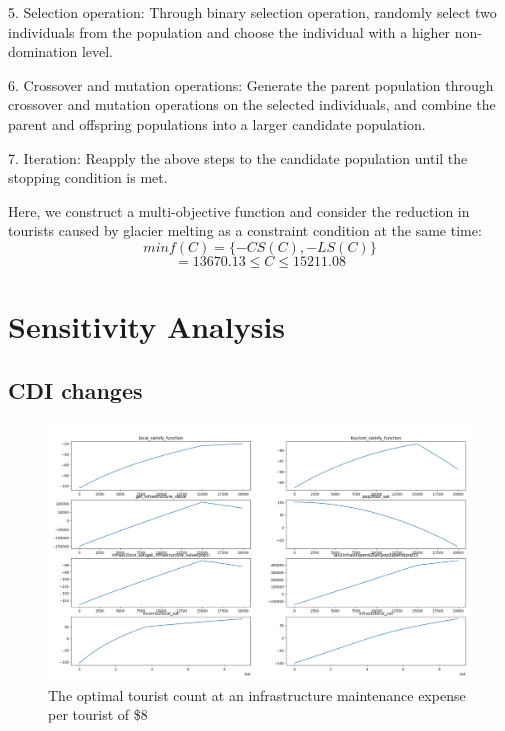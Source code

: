 \documentclass[12pt]{article}  %
\begin{document}
5. Selection operation: Through binary selection operation, randomly select two individuals from the population and choose the individual with a higher non-domination level.

6. Crossover and mutation operations: Generate the parent population through crossover and mutation operations on the selected individuals, and combine the parent and offspring populations into a larger candidate population.

7. Iteration: Reapply the above steps to the candidate population until the stopping condition is met.

Here, we construct a multi-objective function and consider the reduction in tourists caused by glacier melting as a constraint condition at the same time:
 $$minf(C)=\{-CS(C),-LS(C)\}$$
 $$=
 13670.13\leq C\leq15211.08$$
 
 
 

 \section{Sensitivity Analysis}
 \subsection{CDI changes}
 
 
 \begin{figure}[H]  %
 
 \centering  %
 \includegraphics[width=.9\textwidth]{sensitivity12.png} %
 \caption{The optimal tourist count at an infrastructure maintenance expense per tourist of \$8} %
 \label{figx}%
 \end{figure}
\end{document}

